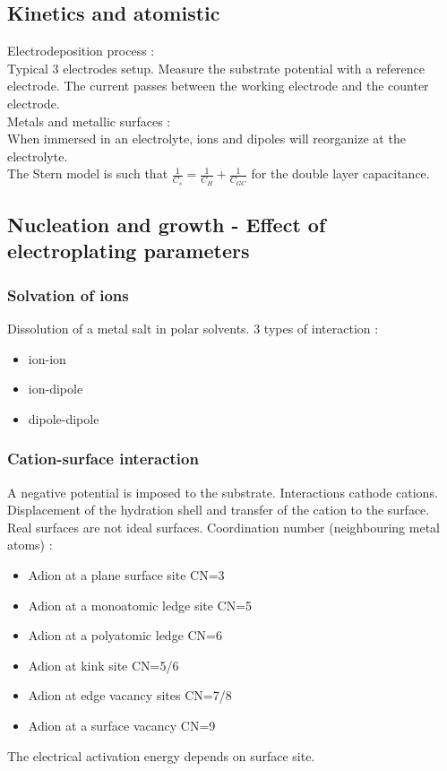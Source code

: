 \documentclass[../main.tex]{subfiles}
\begin{document}
\subsection{Kinetics and atomistic}
Electrodeposition process : \\
Typical 3 electrodes setup. Measure the substrate potential with a reference electrode. The current passes between the working electrode and the counter electrode.\\

Metals and metallic surfaces :\\
When immersed in an electrolyte, ions and dipoles will reorganize at the electrolyte.\\
The Stern model is such that $\frac{1}{C_s} = \frac{1}{C_H}+ \frac{1}{C_{GC}}$ for the double layer capacitance.\\

\subsection{Nucleation and growth - Effect of electroplating parameters}

\subsubsection{Solvation of ions}
Dissolution of a metal salt in polar solvents. 3 types of interaction : \begin{itemize}
    \item ion-ion
    \item ion-dipole
    \item dipole-dipole
\end{itemize}

\subsubsection{Cation-surface interaction}
A negative potential is imposed to the substrate. Interactions cathode cations. Displacement of the hydration shell and transfer of the cation to the surface.\\
Real surfaces are not ideal surfaces. Coordination number (neighbouring metal atoms) : \begin{itemize}
    \item Adion at a plane surface site CN=3
    \item Adion at a monoatomic ledge site CN=5
    \item Adion at a polyatomic ledge CN=6
    \item Adion at kink site CN=5/6
    \item Adion at edge vacancy sites CN=7/8
    \item Adion at a surface vacancy CN=9
\end{itemize}
The electrical activation energy depends on surface site.
\end{document}
